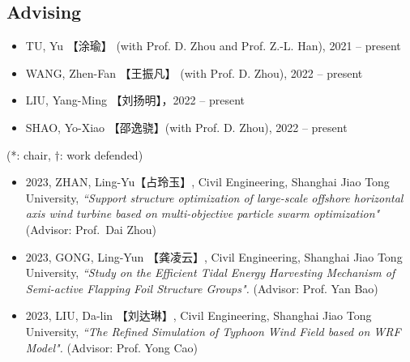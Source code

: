 \documentclass[10pt]{article}
\newenvironment{myitemize}
{ \begin{itemize}
    \setlength{\itemsep}{0pt}
    \setlength{\parskip}{0pt}
    \setlength{\parsep}{0pt}     }
{ \end{itemize}                  }
\begin{document}
\subsection*{Advising}
\begin{myitemize}
\itemsep 0.5em 
\item TU, Yu 【涂瑜】 (with Prof. D. Zhou and Prof. Z.-L. Han), 2021 -- present 
\end{myitemize}

\begin{myitemize}
\itemsep 0.5em 
\item WANG, Zhen-Fan 【王振凡】 (with Prof. D. Zhou), 2022 -- present 
\end{myitemize}

\begin{myitemize}
\itemsep 0.5em 
\item LIU, Yang-Ming 【刘扬明】，2022 -- present
\item SHAO, Yo-Xiao 【邵逸骁】(with Prof. D. Zhou),   2022 -- present
\end{myitemize}



 (*: chair, $\dagger$: work defended)
\begin{myitemize}
\item 2023, ZHAN, Ling-Yu【占玲玉】, Civil Engineering, Shanghai Jiao Tong University, {\it ``Support structure optimization of large-scale offshore horizontal axis wind turbine based on multi-objective particle swarm optimization"} (Advisor: Prof.~Dai Zhou)
\item 2023, GONG, Ling-Yun 【龚凌云】, Civil Engineering, Shanghai Jiao Tong University, {\it ``Study on the Efficient Tidal Energy Harvesting Mechanism of Semi-active Flapping Foil Structure Groups".} (Advisor: Prof. Yan Bao)
\item 2023, LIU, Da-lin 【刘达琳】, Civil Engineering, Shanghai Jiao Tong University, {\it ``The Refined Simulation of Typhoon Wind Field based on WRF Model".} (Advisor: Prof. Yong Cao)

\end{myitemize}
\end{document}
